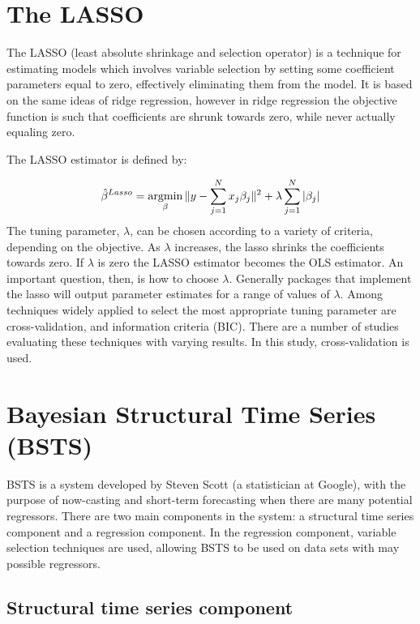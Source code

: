\documentclass[11pt, oneside]{book}   	%
\begin{document}
\section{The LASSO}

The LASSO (least absolute shrinkage and selection operator) is a technique for estimating models which involves variable selection by setting some coefficient parameters equal to zero, effectively eliminating them from the model. It is based on the same ideas of ridge regression, however in ridge regression the objective function is such that coefficients are shrunk towards zero, while never actually equaling zero. 

The LASSO estimator is defined by:

\newcommand*{\argmin}{\operatornamewithlimits{argmin}\limits}
 
$$ \hat{\beta}^{Lasso} = \argmin_{\beta} \| y - \sum_{j=1}^{N}x_{j}\beta_{j}  \|^{2} + \lambda \sum_{j=1}^{N}|\beta_{j}|$$
The tuning parameter, $\lambda$, can be chosen according to a variety of criteria, depending on the objective. As $\lambda$ increases, the lasso shrinks the coefficients towards zero. If $\lambda$ is zero the LASSO estimator becomes the OLS estimator. An important question, then, is how to choose $ \lambda$. Generally packages that implement the lasso will output parameter estimates for a range of values of $\lambda$. Among techniques  widely applied to select the most appropriate tuning parameter are cross-validation, and information criteria (BIC). There are a number of studies evaluating these techniques with varying results. In this study, cross-validation is used. 



\section{Bayesian Structural Time Series (BSTS)}

BSTS is a system developed by Steven Scott (a statistician at Google), with the purpose of now-casting and short-term forecasting when there are many potential regressors. There are two main components in the system: a structural time series component and a regression component. In the regression component, variable selection techniques are used, allowing BSTS to be used on data sets with may possible regressors. 

\subsection{Structural time series component}
\end{document}
